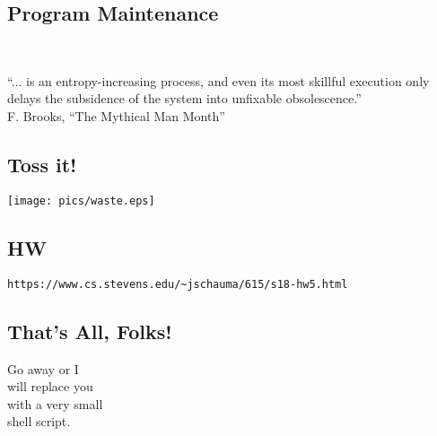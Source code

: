 \documentclass[xga]{xdvislides}
\begin{document}
\subsection{Program Maintenance}
\\
\Huge
\begin{center}
	``... is an entropy-increasing process, and even its most skillful
	execution only delays the subsidence of the system into unfixable
	obsolescence.'' \\
	\addvspace{.2in}
	\small F. Brooks, ``The Mythical Man Month''
\end{center}
\Normalsize

\subsection{Toss it!}
\vspace*{\fill}
\begin{center}
	\texttt{[image: pics/waste.eps]}
\end{center}
\vspace*{\fill}

\subsection{HW}
\vspace{.5in}
\begin{center}
\begin{verbatim}
https://www.cs.stevens.edu/~jschauma/615/s18-hw5.html
\end{verbatim}
\end{center}

\subsection{That's All, Folks!}
\vspace*{\fill}
\Huge
\begin{center}
Go away or I \\
will replace you \\
with a very small \\
shell script.
\end{center}
\Normalsize
\vspace*{\fill}
\end{document}
